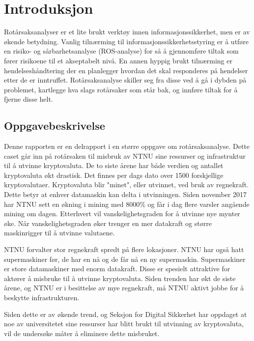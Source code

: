 \chapter{Introduksjon}
Rotårsaksanalyser er et lite brukt verktøy innen informasjonssikkerhet, men er av økende betydning. Vanlig tilnærming til informasjonssikkerhetsstyring er å utføre en risiko- og sårbarhetsanalyse (ROS-analyse) for så å gjennomføre tiltak som fører risikoene til et akseptabelt nivå. En annen hyppig brukt tilnærming er hendelseshåndtering der en planlegger hvordan det skal responderes på hendelser etter de er inntruffet. Rotårsaksanalyse skiller seg fra disse ved å gå i dybden på problemet, kartlegge hva slags rotårsaker som står bak, og innføre tiltak for å fjerne disse helt.

\section{Oppgavebeskrivelse}
Denne rapporten er en delrapport i en større oppgave om rotårsaksanalyse. Dette caset går inn på rotårsaken til misbruk av NTNU sine ressurser og infrastruktur til å utvinne kryptovaluta. De to siste årene har både verdien og antallet kryptovaluta økt drastisk. Det finnes per dags dato over 1500 forskjellige kryptovalutaer. Kryptovaluta blir "minet", eller utvinnet, ved bruk av regnekraft. Dette betyr at enhver datamaskin kan delta i utvinningen. Siden november 2017 har NTNU sett en økning i mining med 8000\% og får i dag flere varsler angående mining om dagen.  Etterhvert vil vanskelighetsgraden for å utvinne nye mynter øke. Når vanskelighetsgraden øker trenger en mer datakraft og større maskinrigger til å utvinne valutaene. 

NTNU forvalter stor regnekraft spredt på flere lokasjoner. NTNU har også hatt supermaskiner før, de har en nå og de får nå en ny supermaskin. Supermaskiner er store datamaskiner med enorm datakraft. Disse er spesielt attraktive for aktører å misbruke til å utvinne kryptovaluta. Siden trenden har økt de siste årene, og NTNU er i besittelse av mye regnekraft, må NTNU aktivt jobbe for å beskytte infrastrukturen. 

Siden dette er av økende trend, og Seksjon for Digital Sikkerhet har oppdaget at noe av universitetet sine ressurser har blitt brukt til utvinning av kryptovaluta, vil de undersøke måter å eliminere dette misbruket. 


